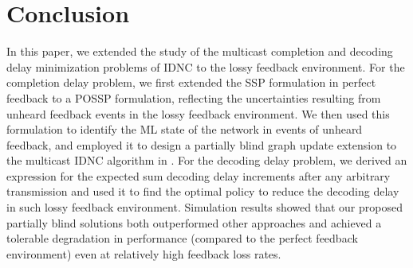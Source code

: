 \documentclass[10pt,jounral]{IEEEtran}
\newcommand{\ignore}[1]{}
\begin{document}
\section{Conclusion} \label{sec:conclusion}
In this paper, we extended the study of the multicast completion and decoding delay minimization problems of IDNC to the lossy feedback environment. For the completion delay problem, we first extended the SSP formulation in perfect feedback to a POSSP formulation, reflecting the uncertainties resulting from unheard feedback events in the lossy feedback environment. We then used this formulation to identify the ML state of the network in events of unheard feedback, and employed it to design a partially blind graph update extension to the multicast IDNC algorithm in \cite{TON10-CD}. For the decoding delay problem, we derived an expression for the expected sum decoding delay increments after any arbitrary transmission and used it to find the optimal policy to reduce the decoding delay in such lossy feedback environment. Simulation results showed that our proposed partially blind solutions both outperformed other approaches and achieved a tolerable degradation in performance (compared to the perfect feedback environment) even at relatively high feedback loss rates.


\ignore{In this letter, we extended the problem of minimizing the completion delay of IDNC to LF environment. We first extended our SSP formulation for the PF environment in \cite{TON10-CD} to a POSSP formulation in the LF environment, by defining the belief state that reflects the uncertainty effects resulting from unheard feedback events. From this extended formulation, we derived the ML estimation of the network state in case of unheard feedback events from any number of receivers. We then proposed a partially blind IDNC graph extension to the algorithms in \cite{TON10-CD}, which follows the ML state of the network. Simulation results showed that this ML graph update approach outperforms two other update approaches for all parameter ranges, especially for large number of receivers. Moreover, the proposed algorithm can achieve a tolerable degradation, compared to the PF environment performance, for considerably high feedback loss rates.}



\end{document}
